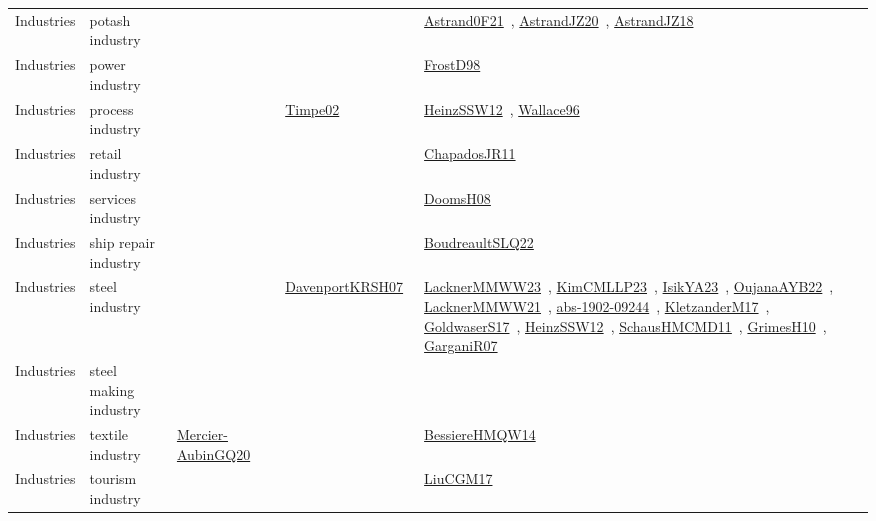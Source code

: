 {\begin{longtable}{lp{3cm}>{\raggedright\arraybackslash}p{6cm}>{\raggedright\arraybackslash}p{6cm}>{\raggedright\arraybackslash}p{8cm}}
Industries & potash industry &  &  & \href{works/Astrand0F21.pdf}{Astrand0F21}~\cite{Astrand0F21}, \href{works/AstrandJZ20.pdf}{AstrandJZ20}~\cite{AstrandJZ20}, \href{works/AstrandJZ18.pdf}{AstrandJZ18}~\cite{AstrandJZ18}\\
Industries & power industry &  &  & \href{works/FrostD98.pdf}{FrostD98}~\cite{FrostD98}\\
Industries & process industry &  & \href{works/Timpe02.pdf}{Timpe02}~\cite{Timpe02} & \href{works/HeinzSSW12.pdf}{HeinzSSW12}~\cite{HeinzSSW12}, \href{works/Wallace96.pdf}{Wallace96}~\cite{Wallace96}\\
Industries & retail industry &  &  & \href{works/ChapadosJR11.pdf}{ChapadosJR11}~\cite{ChapadosJR11}\\
Industries & services industry &  &  & \href{works/DoomsH08.pdf}{DoomsH08}~\cite{DoomsH08}\\
Industries & ship repair industry &  &  & \href{works/BoudreaultSLQ22.pdf}{BoudreaultSLQ22}~\cite{BoudreaultSLQ22}\\
Industries & steel industry &  & \href{works/DavenportKRSH07.pdf}{DavenportKRSH07}~\cite{DavenportKRSH07} & \href{works/LacknerMMWW23.pdf}{LacknerMMWW23}~\cite{LacknerMMWW23}, \href{works/KimCMLLP23.pdf}{KimCMLLP23}~\cite{KimCMLLP23}, \href{works/IsikYA23.pdf}{IsikYA23}~\cite{IsikYA23}, \href{works/OujanaAYB22.pdf}{OujanaAYB22}~\cite{OujanaAYB22}, \href{works/LacknerMMWW21.pdf}{LacknerMMWW21}~\cite{LacknerMMWW21}, \href{works/abs-1902-09244.pdf}{abs-1902-09244}~\cite{abs-1902-09244}, \href{works/KletzanderM17.pdf}{KletzanderM17}~\cite{KletzanderM17}, \href{works/GoldwaserS17.pdf}{GoldwaserS17}~\cite{GoldwaserS17}, \href{works/HeinzSSW12.pdf}{HeinzSSW12}~\cite{HeinzSSW12}, \href{works/SchausHMCMD11.pdf}{SchausHMCMD11}~\cite{SchausHMCMD11}, \href{works/GrimesH10.pdf}{GrimesH10}~\cite{GrimesH10}, \href{works/GarganiR07.pdf}{GarganiR07}~\cite{GarganiR07}\\
Industries & steel making industry &  &  & \\
Industries & textile industry & \href{works/Mercier-AubinGQ20.pdf}{Mercier-AubinGQ20}~\cite{Mercier-AubinGQ20} &  & \href{works/BessiereHMQW14.pdf}{BessiereHMQW14}~\cite{BessiereHMQW14}\\
Industries & tourism industry &  &  & \href{works/LiuCGM17.pdf}{LiuCGM17}~\cite{LiuCGM17}\\
\end{longtable}
}

